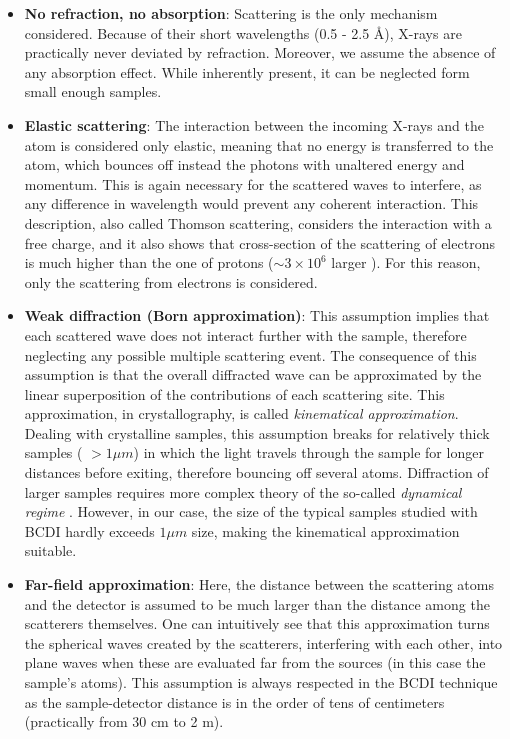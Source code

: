 \begin{itemize}
    \item \textbf{No refraction, no absorption}: Scattering is the only mechanism considered. Because of their short wavelengths
    (0.5 - 2.5 \AA), X-rays are practically never deviated by refraction. Moreover, we assume the absence of any absorption effect. 
    While inherently present, it can be neglected form small enough samples. 
    \item \textbf{Elastic scattering}: The interaction between the incoming X-rays and the atom is considered only elastic, meaning that 
    no energy is transferred to the atom, which bounces off instead the photons with unaltered energy and 
    momentum. This is again necessary for the scattered waves to interfere, as any difference in wavelength would 
    prevent any coherent interaction. This description, also called Thomson scattering, considers the interaction with a free charge, 
    and it also shows that cross-section of the scattering of electrons is much higher than the one of protons ($\sim 3\times10^{6}$ larger ). 
    For this reason, only the scattering from electrons is considered. 
    \item \textbf{Weak diffraction (Born approximation)}: This assumption implies that each scattered wave does not interact 
    further with the sample, therefore neglecting any possible multiple scattering event. The consequence of this assumption 
    is that the overall diffracted wave can be approximated by the linear superposition of the contributions of each scattering site. 
    This approximation, in crystallography, is called \textit{kinematical approximation}. 
    Dealing with crystalline samples, this assumption breaks for relatively thick samples ( $ > 1 \mu m $) in which the 
    light travels through the sample for longer distances before exiting, therefore bouncing off several atoms. 
    Diffraction of larger samples requires more complex theory of the so-called \textit{dynamical regime} \cite{takagi1969dynamical, gorobtsov2016phase, Shabalin2017}.
    However, in our case, the size of the typical samples studied with BCDI hardly exceeds $ 1 \mu m $ size, making the 
    kinematical approximation suitable. 
    \item \textbf{Far-field approximation}: Here, the distance between the scattering atoms and the detector is assumed 
    to be much larger than the distance among the scatterers themselves. One can intuitively see that this approximation 
    turns the spherical waves created by the scatterers, interfering with each other, into plane waves when these are evaluated 
    far from the sources (in this case the sample's atoms). This assumption is always respected in the BCDI 
    technique as the sample-detector distance is in the order of tens of centimeters (practically from 30 cm to 2 m).


\end{itemize}
